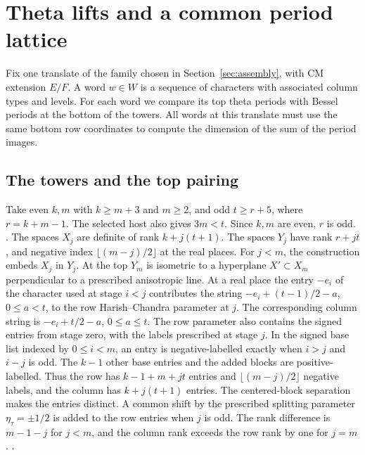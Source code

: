 \section{Theta lifts and a common period lattice}
\label{sec:periods}

Fix one translate of the family chosen in Section~\ref{sec:assembly},
with CM extension \(E/F\). A word \(w\in W\) is a sequence of characters
with associated column types and levels. For each word we compare its
top theta periods with Bessel periods at the bottom of the towers.
All words at this translate must use the same bottom row coordinates
to compute the dimension of the sum of the period images.

\subsection{The towers and the top pairing}

Take even \(k,m\) with \(k\geq m+3\) and \(m\geq2\), and odd \(t\geq r+5\),
where \(r=k+m-1\). The selected host also gives \(3m<t\).
Since \(k,m\) are even, \(r\) is odd.
.
The spaces \(X_j\)
are definite of rank \(k+j(t+1)\). The spaces \(Y_j\) have rank \(r+jt\),
and negative index \(\lfloor(m-j)/2\rfloor\)
at the real places. For \(j<m\), the construction embeds \(X_j\) in
\(Y_j\). At the top \(Y_m\) is isometric to a hyperplane
\(X'\subset X_m\) perpendicular to a prescribed anisotropic line.
At a real place the entry \(-e_i\) of the character used at stage
\(i<j\) contributes the string \(-e_i+(t-1)/2-a\), \(0\leq a<t\), to
the row Harish--Chandra parameter at \(j\). The corresponding column
string is \(-e_i+t/2-a\), \(0\leq a\leq t\). The row parameter also
contains the signed entries from stage zero, with the labels prescribed
at stage \(j\). In the signed base list indexed by \(0\le i<m\), an
entry is negative-labelled exactly when \(i>j\) and \(i-j\) is odd.
The \(k-1\) other base entries and the added blocks are positive-labelled.
Thus the row has \(k-1+m+jt\) entries and
\(\lfloor(m-j)/2\rfloor\) negative labels, and the column has
\(k+j(t+1)\) entries. The centered-block separation makes the entries
distinct. A common shift by the prescribed splitting parameter
\(\eta_\tau=\pm 1/2\) is added to the row entries when \(j\) is odd.
The rank difference is \(m-1-j\) for \(j<m\), and the column rank exceeds
the row rank by one for \(j=m\).
.

